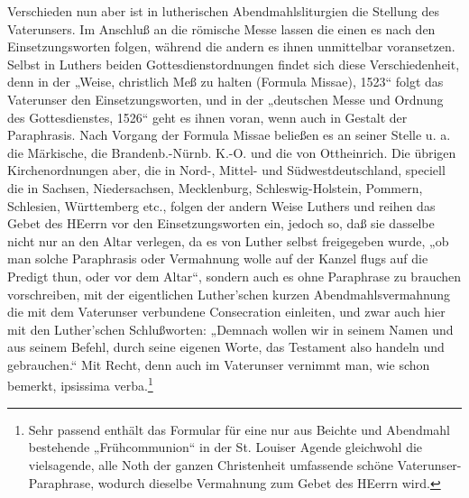 Verschieden nun aber ist in lutherischen Abendmahlsliturgien die Stellung des Vaterunsers. Im Anschluß an die römische Messe lassen die einen es nach den Einsetzungsworten folgen, während die andern es ihnen unmittelbar voransetzen. Selbst in Luthers beiden Gottesdienstordnungen findet sich diese Verschiedenheit, denn in der „Weise, christlich Meß zu halten (Formula Missae), 1523“ folgt das Vaterunser den Einsetzungsworten, und in der „deutschen Messe und Ordnung des Gottesdienstes, 1526“ geht es ihnen voran, wenn auch in Gestalt der Paraphrasis. Nach Vorgang der Formula Missae beließen es an seiner Stelle u. a. die Märkische, die Brandenb.-Nürnb. K.-O. und die von Ottheinrich. Die übrigen Kirchenordnungen aber, die in Nord-, Mittel- und Südwestdeutschland, speciell die in Sachsen, Niedersachsen, Mecklenburg, Schleswig-Holstein, Pommern, Schlesien, Württemberg etc., folgen der andern Weise Luthers und reihen das Gebet des HEerrn vor den Einsetzungsworten ein, jedoch so, daß sie dasselbe nicht nur an den Altar verlegen, da es von Luther selbst freigegeben wurde, „ob man solche Paraphrasis oder Vermahnung wolle auf der Kanzel flugs auf die Predigt thun, oder vor dem Altar“, sondern auch es ohne Paraphrase zu brauchen vorschreiben, mit der eigentlichen Luther’schen kurzen Abendmahlsvermahnung die mit dem Vaterunser verbundene Consecration einleiten, und zwar auch hier mit den Luther’schen Schlußworten: „Demnach wollen wir in seinem Namen und aus seinem Befehl, durch seine eigenen Worte, das Testament also handeln und gebrauchen.“ Mit Recht, denn auch im Vaterunser vernimmt man, wie schon bemerkt, ipsissima verba.\footnote{Sehr passend enthält das Formular für eine nur aus Beichte und Abendmahl bestehende „Frühcommunion“ in der St. Louiser Agende gleichwohl die vielsagende, alle Noth der ganzen Christenheit umfassende schöne Vaterunser-Paraphrase, wodurch dieselbe Vermahnung zum Gebet des HEerrn wird.}


